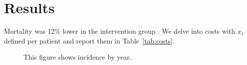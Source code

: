 \section{Results}
Mortality was 12\% lower in the intervention group \cite{smith2020,lee2021}. We delve into costs with $x_{i}$ defined per patient %
and report them in Table~\ref{tab:costs}.

\begin{figure}
\centering
\caption{This figure shows incidence by year.}
\label{fig:incidence}
\end{figure}
